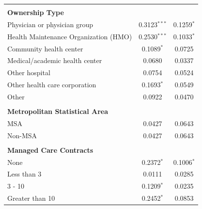 \documentclass[12pt]{report}
\begin{document}
{\begin{center}
\begin{longtable}{lSS[table-format = 0.4]}
                                       &                          &                           \\
\textbf{Ownership Type}                &                          &                           \\
Physician or physician group           & 0.3123$^{***}$               & 0.1259$^{*}$                \\
Health Maintenance Organization (HMO)  & 0.2530$^{***}$               & 0.1033$^{*}$                \\
Community health center                & 0.1089$^{*}$               & 0.0725                    \\
Medical/academic health center         & 0.0680                   & 0.0337                    \\
Other hospital                         & 0.0754                   & 0.0524                    \\
Other health care corporation          & 0.1693$^{*}$               & 0.0549                    \\
Other                                  & 0.0922                   & 0.0470                    \\
                                       &                          &                           \\
\textbf{Metropolitan Statistical Area} &                          &                           \\
MSA                                    & 0.0427                   & 0.0643                    \\
Non-MSA                                & 0.0427                   & 0.0643                    \\
                                       &                          &                           \\
\textbf{Managed Care Contracts}        &                          &                           \\
None                                   & 0.2372$^{*}$               & 0.1006$^{*}$                \\
Less than 3                            & 0.0111                   & 0.0285                    \\
3 - 10                                 & 0.1209$^{*}$               & 0.0235                    \\
Greater than 10                        & 0.2452$^{*}$               & 0.0853                    \\

\end{longtable}
\end{center}}
\end{document}
